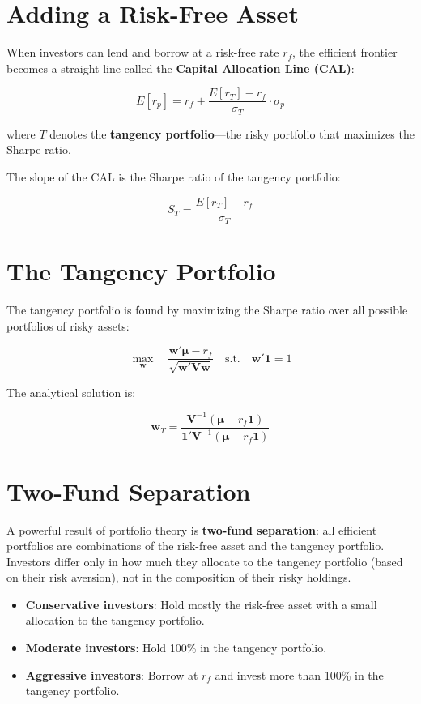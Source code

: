 \documentclass[11pt,letterpaper]{report}
\begin{document}
\section{Adding a Risk-Free Asset}


When investors can lend and borrow at a risk-free rate $r_f$, the efficient frontier becomes a straight line called the \textbf{Capital Allocation Line (CAL)}:

$$E[r_p] = r_f + \frac{E[r_T] - r_f}{\sigma_T} \cdot \sigma_p$$

where $T$ denotes the \textbf{tangency portfolio}---the risky portfolio that maximizes the Sharpe ratio.

The slope of the CAL is the Sharpe ratio of the tangency portfolio:

$$S_T = \frac{E[r_T] - r_f}{\sigma_T}$$

\section{The Tangency Portfolio}


The tangency portfolio is found by maximizing the Sharpe ratio over all possible portfolios of risky assets:

$$\max_{\mathbf{w}} \quad \frac{\mathbf{w}' \boldsymbol{\mu} - r_f}{\sqrt{\mathbf{w}' \mathbf{V} \mathbf{w}}} \quad \text{s.t.} \quad \mathbf{w}' \mathbf{1} = 1$$

The analytical solution is:

$$\mathbf{w}_T = \frac{\mathbf{V}^{-1}(\boldsymbol{\mu} - r_f \mathbf{1})}{\mathbf{1}' \mathbf{V}^{-1}(\boldsymbol{\mu} - r_f \mathbf{1})}$$

\section{Two-Fund Separation}


A powerful result of portfolio theory is \textbf{two-fund separation}: all efficient portfolios are combinations of the risk-free asset and the tangency portfolio.  Investors differ only in how much they allocate to the tangency portfolio (based on their risk aversion), not in the composition of their risky holdings.

\begin{itemize}
  \item \textbf{Conservative investors}: Hold mostly the risk-free asset with a small allocation to the tangency portfolio.
  \item \textbf{Moderate investors}: Hold 100\% in the tangency portfolio.
  \item \textbf{Aggressive investors}: Borrow at $r_f$ and invest more than 100\% in the tangency portfolio.
\end{itemize}
\end{document}
